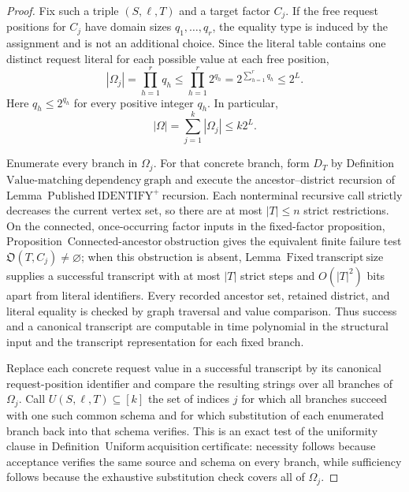 \documentclass{article}
\begin{document}
\begin{proof}
Fix such a triple \((S,\ell,T)\) and a target factor \(C_j\).  If the free request positions for \(C_j\) have domain sizes \(q_1,\ldots,q_r\), the equality type is induced by the assignment and is not an additional choice.  Since the literal table contains one distinct request literal for each possible value at each free position,
\[
  |\Omega_j|=\prod_{h=1}^{r}q_h
  \leq \prod_{h=1}^{r}2^{q_h}
  =2^{\sum_{h=1}^{r}q_h}
  \leq 2^L. \tag{3}
\]
Here \(q_h\leq 2^{q_h}\) for every positive integer \(q_h\).  In particular,
\[
  |\Omega|=\sum_{j=1}^{k}|\Omega_j|\leq k2^L. \tag{4}
\]

Enumerate every branch in \(\Omega_j\).  For that concrete branch, form \(D_T\) by Definition~\(\mathrm{Value\text{-}matching\ dependency\ graph}\) and execute the ancestor--district recursion of Lemma~\(\mathrm{Published\ IDENTIFY^{+}\ recursion}\).  Each nonterminal recursive call strictly decreases the current vertex set, so there are at most \(|T|\leq n\) strict restrictions.  On the connected, once-occurring factor inputs in the fixed-factor proposition, Proposition~\(\mathrm{Connected\text{-}ancestor\ obstruction}\) gives the equivalent finite failure test \(\mathfrak O(T,C_j)\neq\varnothing\); when this obstruction is absent, Lemma~\(\mathrm{Fixed\ transcript\ size}\) supplies a successful transcript with at most \(|T|\) strict steps and \(O(|T|^2)\) bits apart from literal identifiers.  Every recorded ancestor set, retained district, and literal equality is checked by graph traversal and value comparison.  Thus success and a canonical transcript are computable in time polynomial in the structural input and the transcript representation for each fixed branch.

Replace each concrete request value in a successful transcript by its canonical request-position identifier and compare the resulting strings over all branches of \(\Omega_j\).  Call \(U(S,\ell,T)\subseteq[k]\) the set of indices \(j\) for which all branches succeed with one such common schema and for which substitution of each enumerated branch back into that schema verifies.  This is an exact test of the uniformity clause in Definition~\(\mathrm{Uniform\ acquisition\ certificate}\): necessity follows because acceptance verifies the same source and schema on every branch, while sufficiency follows because the exhaustive substitution check covers all of \(\Omega_j\).


\end{proof}
\end{document}
